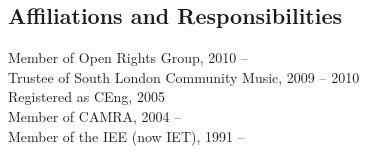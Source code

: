 \documentclass[margin = 0cm,line]{resume}
\begin{document}
\begin{resume}
    \section{\mysidestyle Affiliations and Responsibilities}

    Member of Open Rights Group, 2010 --                                                              \vspace{0.5mm}\\%
    Trustee of South London Community Music, 2009 -- 2010                                             \vspace{0.5mm}\\%
    Registered as CEng, 2005                                                                          \vspace{0.5mm}\\%
    Member of CAMRA, 2004 --                                                                          \vspace{0.5mm}\\%
    Member of the IEE (now IET), 1991 --


\end{resume}
\end{document}
